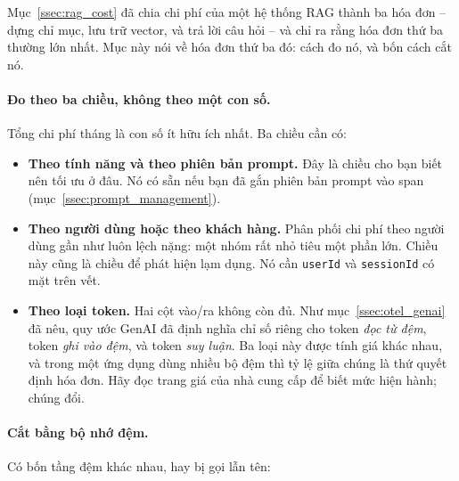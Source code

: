 Mục~\ref{ssec:rag_cost} đã chia chi phí của một hệ thống RAG thành ba hóa đơn -- dựng chỉ mục, lưu trữ vector, và trả lời câu hỏi -- và chỉ ra rằng hóa đơn thứ ba thường lớn nhất. Mục này nói về hóa đơn thứ ba đó: cách đo nó, và bốn cách cắt nó.

\paragraph{Đo theo ba chiều, không theo một con số.} Tổng chi phí tháng là con số ít hữu ích nhất. Ba chiều cần có:

\begin{itemize}
	\item \textbf{Theo tính năng và theo phiên bản prompt.} Đây là chiều cho bạn biết nên tối ưu ở đâu. Nó có sẵn nếu bạn đã gắn phiên bản prompt vào span (mục~\ref{ssec:prompt_management}).
	\item \textbf{Theo người dùng hoặc theo khách hàng.} Phân phối chi phí theo người dùng gần như luôn lệch nặng: một nhóm rất nhỏ tiêu một phần lớn. Chiều này cũng là chiều để phát hiện lạm dụng. Nó cần \texttt{userId} và \texttt{sessionId} có mặt trên vết.
	\item \textbf{Theo loại token.} Hai cột vào/ra không còn đủ. Như mục~\ref{ssec:otel_genai} đã nêu, quy ước GenAI đã định nghĩa chỉ số riêng cho token \emph{đọc từ đệm}, token \emph{ghi vào đệm}, và token \emph{suy luận}. Ba loại này được tính giá khác nhau, và trong một ứng dụng dùng nhiều bộ đệm thì tỷ lệ giữa chúng là thứ quyết định hóa đơn. Hãy đọc trang giá của nhà cung cấp để biết mức hiện hành; chúng đổi.
\end{itemize}

\paragraph{Cắt bằng bộ nhớ đệm.} Có bốn tầng đệm khác nhau, hay bị gọi lẫn tên:

